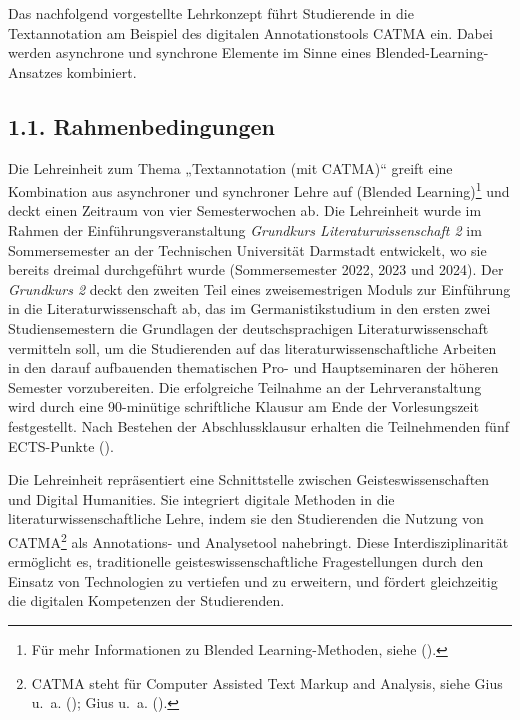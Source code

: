 \documentclass[
          a4paper,
        ]{article}
\begin{document}
Das nachfolgend vorgestellte Lehrkonzept führt Studierende in die
Textannotation am Beispiel des digitalen Annotationstools CATMA ein.
Dabei werden asynchrone und synchrone Elemente im Sinne eines
Blended-Learning-Ansatzes kombiniert.

\subsection{1.1. Rahmenbedingungen}\label{rahmenbedingungen}

Die Lehreinheit zum Thema „Textannotation (mit CATMA)`` greift eine
Kombination aus asynchroner und synchroner Lehre auf (Blended
Learning)\footnote{Für mehr Informationen zu Blended Learning-Methoden,
  siehe ().} und deckt einen Zeitraum von vier Semesterwochen ab.
Die Lehreinheit wurde im Rahmen der Einführungsveranstaltung
\emph{Grundkurs Literaturwissenschaft 2} im Sommersemester an der
Technischen Universität Darmstadt entwickelt, wo sie bereits dreimal
durchgeführt wurde (Sommersemester 2022, 2023 und 2024). Der
\emph{Grundkurs 2} deckt den zweiten Teil eines zweisemestrigen Moduls
zur Einführung in die Literaturwissenschaft ab, das im
Germanistikstudium in den ersten zwei Studiensemestern die Grundlagen
der deutschsprachigen Literaturwissenschaft vermitteln soll, um die
Studierenden auf das literaturwissenschaftliche Arbeiten in den darauf
aufbauenden thematischen Pro- und Hauptseminaren der höheren Semester
vorzubereiten. Die erfolgreiche Teilnahme an der Lehrveranstaltung wird
durch eine 90-minütige schriftliche Klausur am Ende der Vorlesungszeit
festgestellt. Nach Bestehen der Abschlussklausur erhalten die
Teilnehmenden fünf ECTS-Punkte
().

Die Lehreinheit repräsentiert eine Schnittstelle zwischen
Geisteswissenschaften und Digital Humanities. Sie integriert digitale
Methoden in die literaturwissenschaftliche Lehre, indem sie den
Studierenden die Nutzung von CATMA\footnote{CATMA steht für Computer
  Assisted Text Markup and Analysis, siehe Gius u.~a.
  (); Gius u.~a.
  ().} als Annotations- und
Analysetool nahebringt. Diese Interdisziplinarität ermöglicht es,
traditionelle geisteswissenschaftliche Fragestellungen durch den Einsatz
von Technologien zu vertiefen und zu erweitern, und fördert gleichzeitig
die digitalen Kompetenzen der Studierenden.
\end{document}
